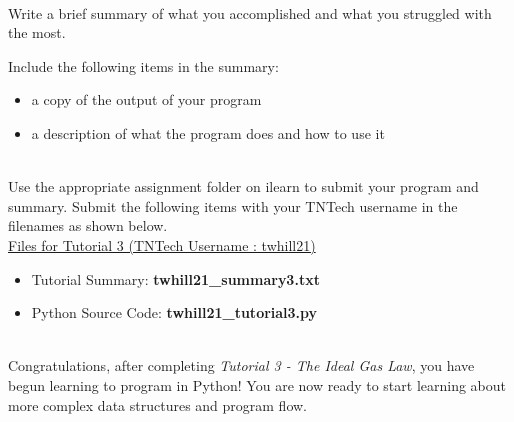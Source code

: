 \documentclass[12pt]{article}
\begin{document}
\begin{description}[labelindent=1cm]
\begin{lstlisting}
\end{lstlisting}

\item[\textbf{\underline{Tutorial Summary:}}] \hfill \vspace{3mm}\\ 
Write a brief summary of what you accomplished and what you struggled with the most. 

Include the following items in the summary:
\begin{itemize}

\item a copy of the output of your program
\item a description of what the program does and how to use it

\end{itemize}


\item[\textbf{\underline{Submission on Teams:}}] \hfill \vspace{3mm}\\ 
Use the appropriate assignment folder on ilearn to submit your program and summary. Submit the following items with your TNTech username in the filenames as shown below. \vspace{0mm}\\

\underline{Files for Tutorial 3 (TNTech Username : twhill21)}

\begin{itemize}

\item Tutorial Summary: \textbf{ twhill21\_summary3.txt}

\item Python Source Code: \textbf{ twhill21\_tutorial3.py}

\end{itemize}


\item[\textbf{\underline{Tutorial Complete:}}] \hfill \vspace{3mm}\\ 
	Congratulations, after completing {\it Tutorial 3 - The Ideal Gas Law}, you have begun learning to program in Python! You are now ready to start learning about more complex data structures and program flow. \\

\end{description}
\end{document}
